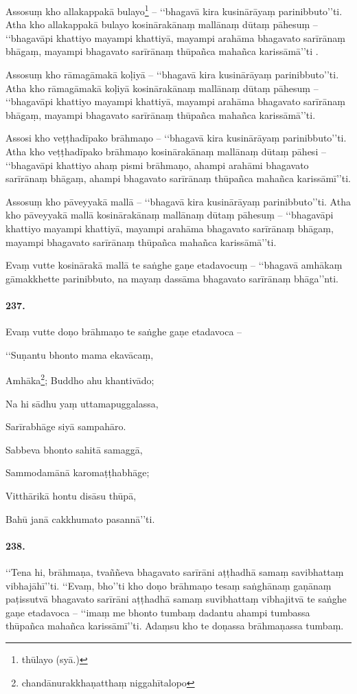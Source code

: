 Assosuṃ kho allakappakā bulayo\footnote{thūlayo (syā.)} – ‘‘bhagavā kira kusinārāyaṃ parinibbuto’’ti. Atha kho allakappakā bulayo kosinārakānaṃ mallānaṃ dūtaṃ pāhesuṃ – ‘‘bhagavāpi khattiyo mayampi khattiyā, mayampi arahāma bhagavato sarīrānaṃ bhāgaṃ, mayampi bhagavato sarīrānaṃ thūpañca mahañca karissāmā’’ti .

Assosuṃ kho rāmagāmakā koḷiyā – ‘‘bhagavā kira kusinārāyaṃ parinibbuto’’ti. Atha kho rāmagāmakā koḷiyā kosinārakānaṃ mallānaṃ dūtaṃ pāhesuṃ – ‘‘bhagavāpi khattiyo mayampi khattiyā, mayampi arahāma bhagavato sarīrānaṃ bhāgaṃ, mayampi bhagavato sarīrānaṃ thūpañca mahañca karissāmā’’ti.

Assosi kho veṭṭhadīpako brāhmaṇo – ‘‘bhagavā kira kusinārāyaṃ parinibbuto’’ti. Atha kho veṭṭhadīpako brāhmaṇo kosinārakānaṃ mallānaṃ dūtaṃ pāhesi – ‘‘bhagavāpi khattiyo ahaṃ pismi brāhmaṇo, ahampi arahāmi bhagavato sarīrānaṃ bhāgaṃ, ahampi bhagavato sarīrānaṃ thūpañca mahañca karissāmī’’ti.

Assosuṃ kho pāveyyakā mallā – ‘‘bhagavā kira kusinārāyaṃ parinibbuto’’ti. Atha kho pāveyyakā mallā kosinārakānaṃ mallānaṃ dūtaṃ pāhesuṃ – ‘‘bhagavāpi khattiyo mayampi khattiyā, mayampi arahāma bhagavato sarīrānaṃ bhāgaṃ, mayampi bhagavato sarīrānaṃ thūpañca mahañca karissāmā’’ti.

Evaṃ vutte kosinārakā mallā te saṅghe gaṇe etadavocuṃ – ‘‘bhagavā amhākaṃ gāmakkhette parinibbuto, na mayaṃ dassāma bhagavato sarīrānaṃ bhāga’’nti.

\paragraph{237.} Evaṃ vutte doṇo brāhmaṇo te saṅghe gaṇe etadavoca –

‘‘Suṇantu bhonto mama ekavācaṃ,

Amhāka\footnote{chandānurakkhaṇatthaṃ niggahītalopo}; Buddho ahu khantivādo;

Na hi sādhu yaṃ uttamapuggalassa,

Sarīrabhāge siyā sampahāro.

Sabbeva bhonto sahitā samaggā,

Sammodamānā karomaṭṭhabhāge;

Vitthārikā hontu disāsu thūpā,

Bahū janā cakkhumato pasannā’’ti.

\paragraph{238.} ‘‘Tena hi, brāhmaṇa, tvaññeva bhagavato sarīrāni aṭṭhadhā samaṃ savibhattaṃ vibhajāhī’’ti. ‘‘Evaṃ, bho’’ti kho doṇo brāhmaṇo tesaṃ saṅghānaṃ gaṇānaṃ paṭissutvā bhagavato sarīrāni aṭṭhadhā samaṃ suvibhattaṃ vibhajitvā te saṅghe gaṇe etadavoca – ‘‘imaṃ me bhonto tumbaṃ dadantu ahampi tumbassa thūpañca mahañca karissāmī’’ti. Adaṃsu kho te doṇassa brāhmaṇassa tumbaṃ.

